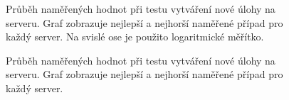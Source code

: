             \begin{figure}[h!t]
             \begin{adjustwidth}{-0.5cm}{}
                \begin{center}
                    \caption{Průběh naměřených hodnot při testu vytváření nové úlohy na serveru.
                        Graf zobrazuje nejlepší a nejhorší naměřené případ pro každý server.  
                        Na svislé ose je použito logaritmické měřítko.}
                    \label{imgCreateFreestyleCely}
                \end{center}
             \end{adjustwidth}
            \end{figure}

            \begin{figure}[h!t]
             \begin{adjustwidth}{-0.5cm}{}
                \begin{center}
                    \caption{Průběh naměřených hodnot při testu vytváření nové úlohy na serveru.
                        Graf zobrazuje nejlepší a nejhorší naměřené případ pro každý server.}
                    \label{imgCreateFreestyleCast}
                \end{center}
             \end{adjustwidth}
            \end{figure}

